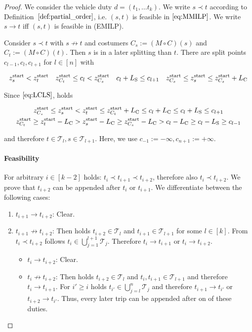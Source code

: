 \begin{proof}

We consider the vehicle duty $d=\left(t_1,\dots t_k\right)$. We write $s\prec t$ according to Definition~$\ref{def:partial_order}$, i.e. $(s,t)$ is feasible in $\eqref{eq:MMILP}$. We write $s\to t$ iff $(s,t)$ is feasible in (EMILP).

Consider $s\prec t$ with $s\not\to t$ and costumers $C_s:=(M\circ C)(s)$ and $C_t:=(M\circ C)(t)$. Then $s$ is in a later splitting than $t$. There are split points $c_{l-1},c_l,c_{l+1}$ for $l\in[n]$ with

\begin{align*}
	z^{\operatorname{start}}_s < z^{\operatorname{start}}_t && z^{\operatorname{start}}_{C_t}\leq c_l <z^{\operatorname{start}}_{C_s} && c_l+L_{\operatorname{S}}\leq c_{l+1} && z^{\operatorname{start}}_{C_s}\leq z^{\operatorname{start}}_s\leq z^{\operatorname{start}}_{C_s}+L_{\operatorname{C}}
\end{align*}

Since $\eqref{eq:LCLS}$, holds

\begin{gather*}
	z^{\operatorname{start}}_{C_s} \leq z^{\operatorname{start}}_s < z^{\operatorname{start}}_t\leq z^{\operatorname{start}}_{C_t}+L_{\operatorname{C}} \leq c_l+L_{\operatorname{C}} \leq c_l+L_{\operatorname{S}} \leq c_{l+1} \\
	z^{\operatorname{start}}_{C_t} \geq z^{\operatorname{start}}_t-L_{\operatorname{C}} > z^{\operatorname{start}}_s-L_{\operatorname{C}} \geq z^{\operatorname{start}}_{C_s}-L_{\operatorname{C}} > c_l-L_{\operatorname{C}}\geq c_l-L_{\operatorname{S}}\geq c_{l-1}
\end{gather*}

and therefore $t\in\mathcal{T}_l,s\in\mathcal{T}_{l+1}$. Here, we use $c_{-1}:=-\infty,c_{n+1}:=+\infty$.

\paragraph{Feasibility}

For arbitrary $i\in[k-2]$ holds: $t_i\prec t_{i+1}\prec t_{i+2}$, therefore also $t_i\prec t_{i+2}$. We prove that $t_{i+2}$ can be appended after $t_{i}$ or $t_{i+1}$. We differentiate between the following cases:

\begin{enumerate}
	\item{$t_{i+1}\to t_{i+2}$:}
		Clear.
	\item{$t_{i+1}\not\to t_{i+2}$:}
		Then holds $t_{i+2}\in\mathcal{T}_l$ and $t_{i+1}\in\mathcal{T}_{l+1}$ for some $l\in[k]$. From $t_i\prec t_{i+2}$ follows $t_i\in\bigcup_{j=1}^{l+1}\mathcal{T}_j$. Therefore $t_i\to t_{i+1}$ or $t_i\to t_{i+2}$.
	\begin{itemize}
		\item{$t_i\to t_{i+2}$:}
			Clear.
		\item{$t_i\not\to t_{i+2}$:}
			Then holds $t_{i+2}\in\mathcal{T}_l$ and $t_i,t_{i+1}\in\mathcal{T}_{l+1}$ and therefore $t_i\to t_{i+1}$. For $i'\geq i$ holds $t_{i'}\in\bigcup_{j=l}^n \mathcal{T}_j$ and therefore $t_{i+1}\to t_{i'}$ or $t_{i+2}\to t_{i'}$. Thus, every later trip can be appended after on of these duties.
	\end{itemize}
\end{enumerate}


\end{proof}
